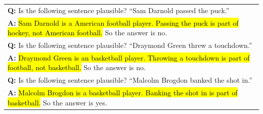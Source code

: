 \documentclass[]{article}
\theoremstyle{plain}
\theoremstyle{definition}
\theoremstyle{remark}
\begin{document}
\begin{table}[H]
\begin{tabular}{p{\linewidth}}
        \vspace{0mm}
        \textbf{Q:} Is the following sentence plausible? ``Sam Darnold passed the puck.'' \\
        \vspace{-1mm}
        \textbf{A:} \hl{Sam Darnold is a American football player. Passing the puck is part of hockey, not American football.} So the answer is no. \\
        \vspace{0mm}
        \textbf{Q:} Is the following sentence plausible? ``Draymond Green threw a touchdown.'' \\
        \vspace{-1mm}
        \textbf{A:} \hl{Draymond Green is an basketball player. Throwing a touchdown is part of football, not basketball.} So the answer is no. \\
        \vspace{0mm}
        \textbf{Q:} Is the following sentence plausible? ``Malcolm Brogdon banked the shot in.'' \\
        \vspace{-1mm}
        \textbf{A:} \hl{Malcolm Brogdon is a basketball player. Banking the shot in is part of basketball.} So the answer is yes. \\
        \bottomrule
    \end{tabular}
    \label{tab:appendix-sports-understanding-prompt}
\end{table}
\endgroup
\begingroup
\end{document}
